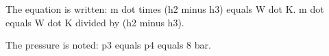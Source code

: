The equation is written:  
m dot times (h2 minus h3) equals W dot K.  
m dot equals W dot K divided by (h2 minus h3).  

The pressure is noted:  
p3 equals p4 equals 8 bar.